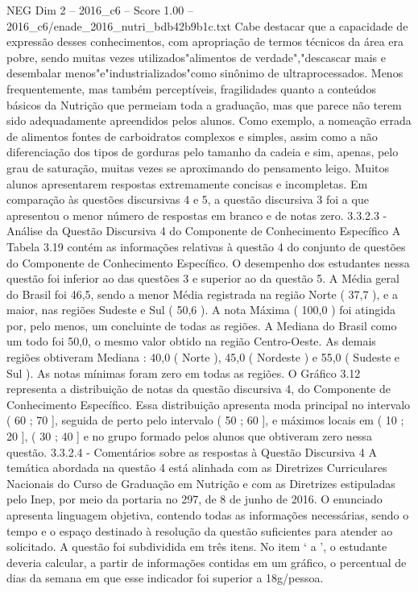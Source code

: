 \begin{textsample}{NEG Dim 2 – 2016\_c6 – Score 1.00 – 2016\_c6/enade\_2016\_nutri\_bdb42b9b1c.txt}
Cabe destacar que a capacidade de expressão desses conhecimentos, com apropriação de termos técnicos da área era pobre, sendo muitas vezes utilizados"alimentos de verdade","descascar mais e desembalar menos"e"industrializados"como sinônimo de ultraprocessados.
Menos frequentemente, mas também perceptíveis, fragilidades quanto a conteúdos básicos da Nutrição que permeiam toda a graduação, mas que parece não terem sido adequadamente apreendidos pelos alunos.
Como exemplo, a nomeação errada de alimentos fontes de carboidratos complexos e simples, assim como a não diferenciação dos tipos de gorduras pelo tamanho da cadeia e sim, apenas, pelo grau de saturação, muitas vezes se aproximando do pensamento leigo.
Muitos alunos apresentarem respostas extremamente concisas e incompletas.
Em comparação às questões discursivas 4 e 5, a questão discursiva 3 foi a que apresentou o menor número de respostas em branco e de notas zero. 3.3.2.3 - Análise da Questão Discursiva 4 do Componente de Conhecimento Específico A Tabela 3.19 contém as informações relativas à questão 4 do conjunto de questões do Componente de Conhecimento Específico.
O desempenho dos estudantes nessa questão foi inferior ao das questões 3 e superior ao da questão 5.
A Média geral do Brasil foi 46,5, sendo a menor Média registrada na região Norte ( 37,7 ), e a maior, nas regiões Sudeste e Sul ( 50,6 ).
A nota Máxima ( 100,0 ) foi atingida por, pelo menos, um concluinte de todas as regiões.
A Mediana do Brasil como um todo foi 50,0, o mesmo valor obtido na região Centro-Oeste.
As demais regiões obtiveram Mediana : 40,0 ( Norte ), 45,0 ( Nordeste ) e 55,0 ( Sudeste e Sul ).
As notas mínimas foram zero em todas as regiões.
O Gráfico 3.12 representa a distribuição de notas da questão discursiva 4, do Componente de Conhecimento Específico.
Essa distribuição apresenta moda principal no intervalo ( 60 ; 70 ], seguida de perto pelo intervalo ( 50 ; 60 ], e máximos locais em ( 10 ; 20 ], ( 30 ; 40 ] e no grupo formado pelos alunos que obtiveram zero nessa questão. 3.3.2.4 - Comentários sobre as respostas à Questão Discursiva 4 A temática abordada na questão 4 está alinhada com as Diretrizes Curriculares Nacionais do Curso de Graduação em Nutrição e com as Diretrizes estipuladas pelo Inep, por meio da portaria no 297, de 8 de junho de 2016.
O enunciado apresenta linguagem objetiva, contendo todas as informações necessárias, sendo o tempo e o espaço destinado à resolução da questão suficientes para atender ao solicitado.
A questão foi subdividida em três itens.
No item ‘ a ’, o estudante deveria calcular, a partir de informações contidas em um gráfico, o percentual de dias da semana em que esse indicador foi superior a 18g/pessoa.

\end{textsample}
